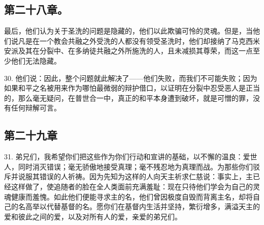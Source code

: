 
\subsection{第二十八章。}

最后，他们认为关于圣洗的问题是隐藏的，他们以此欺骗可怜的灵魂。但是，当他们说凡是在一个教会共融之外受洗的人都没有领受圣洗时，他们却接纳了马克西米安派及其在分裂中、在多纳徒共融之外所施洗的人，且未减损其尊荣，而这一点至少他们无法隐藏。\par

30. 他们说：因此，整个问题就此解决了——他们失败，而我们不可能失败；因为如果和平之名被用来作为哪怕最微弱的辩护借口，以证明在分裂中忍受恶人是正当的，那么毫无疑问，在普世合一中，真正的和平本身遭到破坏，就是可憎的罪，没有任何辩解可言。\par


\subsection{第二十九章}

31. 弟兄们，我希望你们把这些作为你们行动和宣讲的基础，以不懈的温良：爱世人，同时消灭错误；毫无骄傲地接受真理；毫不残忍地为真理而战。为那些你们驳斥并说服其错误的人祈祷。因为先知为这样的人向天主祈求仁慈说：事实上，主已经这样做了，使追随者的脸在全人类面前充满羞耻：现在只待他们学会为自己的灵魂健康而羞愧。如此他们便能寻求主的名，他们曾因极度自毁而背离主名，却将自己的名高举以代替基督的名。愿你们在基督内生活并坚持，繁衍增多，满溢天主的爱和彼此之间的爱，以及对所有人的爱，亲爱的弟兄们。\par



\section{}

